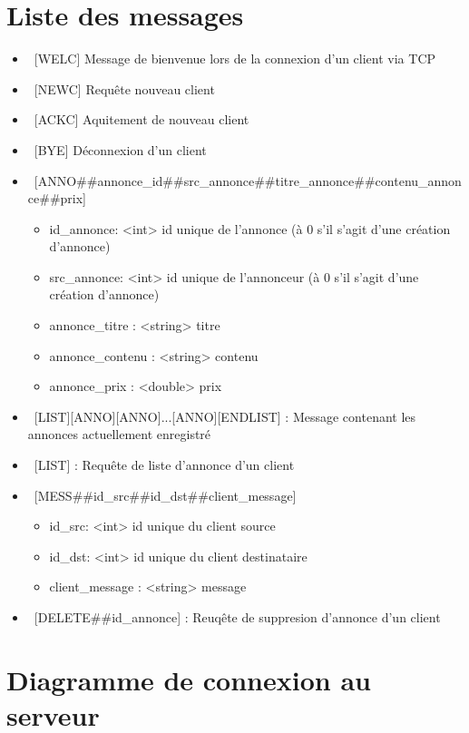 \documentclass[12pt]{article}
\begin{document}
\section{Liste des messages}

\begin{itemize}
  \item~[WELC] Message de bienvenue lors de la connexion d'un client via TCP
  \item~[NEWC] Requête nouveau client
  \item~[ACKC] Aquitement de nouveau client
  \item~[BYE]  Déconnexion d'un client
  \item~[ANNO\#\#annonce\_id\#\#src\_annonce\#\#titre\_annonce\#\#contenu\_annonce\#\#prix]
  \begin{itemize}
    \item id\_annonce: <int>  id unique de l'annonce (à 0 s'il s'agit d'une création d'annonce)
    \item src\_annonce: <int> id unique de l'annonceur (à 0 s'il s'agit d'une création d'annonce)
    \item annonce\_titre : <string> titre
    \item annonce\_contenu : <string> contenu
    \item annonce\_prix : <double> prix
  \end{itemize}
  \item~[LIST][ANNO][ANNO]...[ANNO][ENDLIST] : Message contenant les annonces actuellement enregistré
  \item~[LIST] : Requête de liste d'annonce d'un client
  \item~[MESS\#\#id\_src\#\#id\_dst\#\#client\_message]
  \begin{itemize}
    \item id\_src: <int> id unique du client source 
    \item id\_dst: <int> id unique du client destinataire
    \item client\_message : <string> message
  \end{itemize}
  \item~[DELETE\#\#id\_annonce] : Reuqête de suppresion d'annonce d'un client
\end{itemize}


\section{Diagramme de connexion au serveur}
\end{document}
